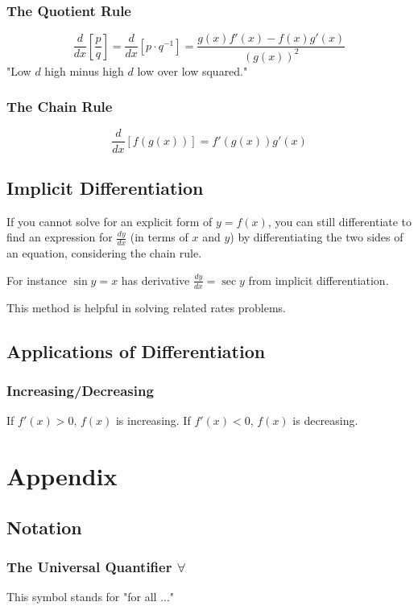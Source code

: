 \documentclass{article}
\begin{document}
\subsubsection{The Quotient Rule}
$$\frac{d}{dx}\left[\frac{p}{q}\right] = \frac{d}{dx}\left[p\cdot q^{-1}\right] = \frac{g(x)f'(x) - f(x)g'(x)}{\left(g(x)\right)^2}$$
"Low $d$ high minus high $d$ low over low squared."

\subsubsection{The Chain Rule}
$$\frac{d}{dx}\left[f(g(x))\right] = f'(g(x))g'(x)$$

\subsection{Implicit Differentiation}
If you cannot solve for an explicit form of $y=f(x)$, you can still differentiate to find an expression for $\frac{dy}{dx}$ (in terms of $x$ and $y$) by differentiating the two sides of an equation, considering the chain rule.

For instance $\sin{y}=x$ has derivative $\frac{dy}{dx}=\sec{y}$ from implicit differentiation.

This method is helpful in solving related rates problems.

\subsection{Applications of Differentiation}
\subsubsection{Increasing/Decreasing}
If $f'(x) > 0$, $f(x)$ is increasing. If $f'(x) < 0$, $f(x)$ is decreasing.


\section{Appendix}
\subsection{Notation}
\subsubsection{\texorpdfstring{The Universal Quantifier $\forall$}{The Universal Quantifier}}
This symbol stands for "for all ..."
\end{document}

